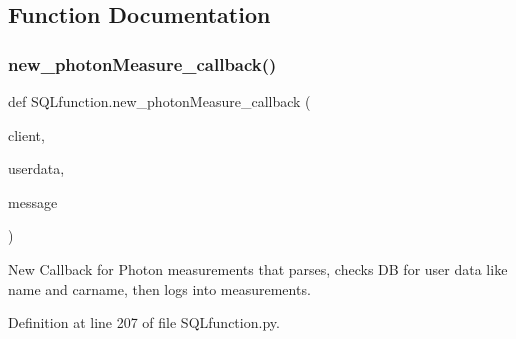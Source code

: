 \subsection{Function Documentation}
\mbox{\label{namespace_s_q_lfunction_a356dd5906768f7dd778408f466e9f9b4}} 
\subsubsection{\texorpdfstring{new\+\_\+photon\+Measure\+\_\+callback()}{new\_photonMeasure\_callback()}}
{\footnotesize\ttfamily def S\+Q\+Lfunction.\+new\+\_\+photon\+Measure\+\_\+callback (\begin{DoxyParamCaption}\item[{}]{client,  }\item[{}]{userdata,  }\item[{}]{message }\end{DoxyParamCaption})}



New Callback for Photon measurements that parses, checks DB for user data like name and carname, then logs into \textquotesingle{}measurements\textquotesingle{}. 



Definition at line 207 of file S\+Q\+Lfunction.\+py.


